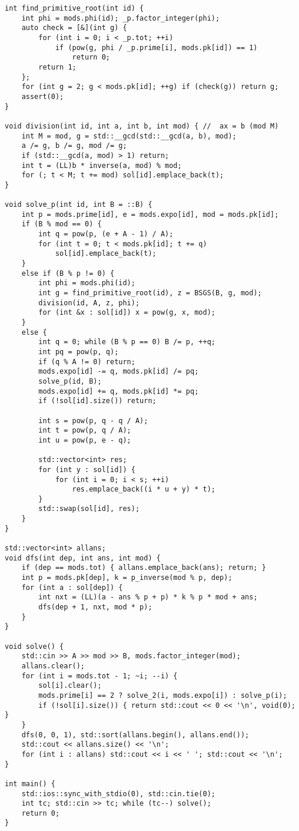 \begin{verbatim}
int find_primitive_root(int id) {
    int phi = mods.phi(id); _p.factor_integer(phi);
    auto check = [&](int g) {
        for (int i = 0; i < _p.tot; ++i)
            if (pow(g, phi / _p.prime[i], mods.pk[id]) == 1)
                return 0;
        return 1;
    };
    for (int g = 2; g < mods.pk[id]; ++g) if (check(g)) return g;
    assert(0);
}

void division(int id, int a, int b, int mod) { //  ax = b (mod M)
    int M = mod, g = std::__gcd(std::__gcd(a, b), mod);
    a /= g, b /= g, mod /= g;
    if (std::__gcd(a, mod) > 1) return;
    int t = (LL)b * inverse(a, mod) % mod;
    for (; t < M; t += mod) sol[id].emplace_back(t);
}

void solve_p(int id, int B = ::B) {
    int p = mods.prime[id], e = mods.expo[id], mod = mods.pk[id];
    if (B % mod == 0) {
        int q = pow(p, (e + A - 1) / A);
        for (int t = 0; t < mods.pk[id]; t += q)
            sol[id].emplace_back(t);
    }
    else if (B % p != 0) {
        int phi = mods.phi(id);
        int g = find_primitive_root(id), z = BSGS(B, g, mod);
        division(id, A, z, phi);
        for (int &x : sol[id]) x = pow(g, x, mod);
    }
    else {
        int q = 0; while (B % p == 0) B /= p, ++q;
        int pq = pow(p, q);
        if (q % A != 0) return;
        mods.expo[id] -= q, mods.pk[id] /= pq;
        solve_p(id, B);
        mods.expo[id] += q, mods.pk[id] *= pq;
        if (!sol[id].size()) return;

        int s = pow(p, q - q / A);
        int t = pow(p, q / A);
        int u = pow(p, e - q);

        std::vector<int> res;
        for (int y : sol[id]) {
            for (int i = 0; i < s; ++i)
                res.emplace_back((i * u + y) * t);
        }
        std::swap(sol[id], res);
    }
}

std::vector<int> allans;
void dfs(int dep, int ans, int mod) {
    if (dep == mods.tot) { allans.emplace_back(ans); return; }
    int p = mods.pk[dep], k = p_inverse(mod % p, dep);
    for (int a : sol[dep]) {
        int nxt = (LL)(a - ans % p + p) * k % p * mod + ans;
        dfs(dep + 1, nxt, mod * p);
    }
}

void solve() {
    std::cin >> A >> mod >> B, mods.factor_integer(mod);
    allans.clear();
    for (int i = mods.tot - 1; ~i; --i) {
        sol[i].clear();
        mods.prime[i] == 2 ? solve_2(i, mods.expo[i]) : solve_p(i);
        if (!sol[i].size()) { return std::cout << 0 << '\n', void(0); }
    }
    dfs(0, 0, 1), std::sort(allans.begin(), allans.end());
    std::cout << allans.size() << '\n';
    for (int i : allans) std::cout << i << ' '; std::cout << '\n';
}

int main() {
    std::ios::sync_with_stdio(0), std::cin.tie(0);
    int tc; std::cin >> tc; while (tc--) solve();
    return 0;
}
\end{verbatim}


